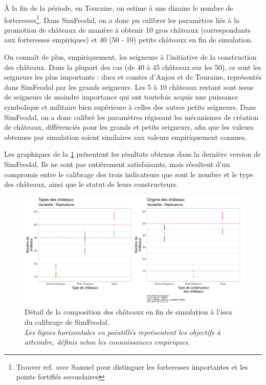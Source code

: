 À la fin de la période, en Touraine, on estime à une dizaine le nombre de \og forteresses\fg{}\footnote{
	Trouver ref. avec Samuel pour distinguer les \og forteresses importantes\fg{} et les \og points fortifiés secondaires\fg{}
}.
Dans SimFeodal, on a donc pu calibrer les paramètres liés à la promotion de châteaux de manière à obtenir 10 gros châteaux (correspondants aux forteresses empiriques) et 40 (50 - 10) petits châteaux en fin de simulation.

On connaît de plus, empiriquement, les seigneurs à l'initiative de la construction des châteaux.
Dans la plupart des cas (de 40 à 45 châteaux sur les 50), ce sont les seigneurs les plus importants : ducs et comtes d'Anjou et de Touraine, représentés dans SimFeodal par les grands seigneurs.
Les 5 à 10 châteaux restant sont issus de seigneurs de moindre importance qui ont toutefois acquis une puissance symbolique et militaire bien supérieure à celles des autres petits seigneurs.
Dans SimFeodal, on a donc calibré les paramètres régissant les mécanismes de création de châteaux, différenciés pour les grands et petits seigneurs, afin que les valeurs obtenues par simulation soient similaires aux valeurs empiriquement connues.

Les graphiques de la \cref{fig:calibrage-chateaux-composition} présentent les résultats obtenus dans la dernière version de SimFeodal.
Ils ne sont pas entièrement satisfaisants, mais résultent d'un compromis entre le calibrage des trois indicateurs que sont le nombre et le type des châteaux, ainsi que le statut de leurs constructeurs.

\begin{figure}[H]
	\centering
	\includegraphics[width=\linewidth]{img/Chateaux_Types_condenses.pdf}
	\caption[Détail de la composition des châteaux en fin de simulation à l'issu du calibrage de SimFeodal.]{Détail de la composition des châteaux en fin de simulation à l'issu du calibrage de SimFeodal.\\
	\textit{Les lignes horizontales en pointillés représentent les objectifs à atteindre, définis selon les connaissances empiriques.}}
	\label{fig:calibrage-chateaux-composition}
\end{figure}



